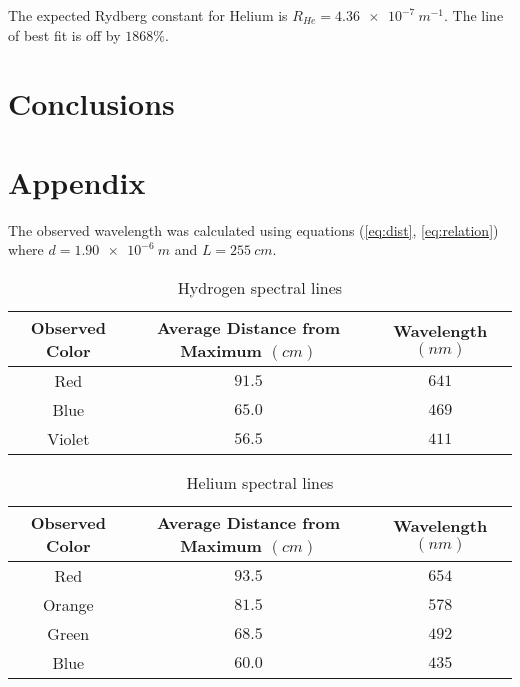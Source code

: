 \documentclass{article}
\newcommand{\givenGrating}[0]{\ensuremath{\num{1.90e-6} \: \si{m}}}
\newcommand{\length}[0]{\ensuremath{\num{255} \: \si{cm}}}
\begin{document}
The expected Rydberg constant for Helium is $R_{He} = \num{4.36e-7} \: \si{m^{-1}}$.
The line of best fit is off by $1868\%$.

\section{Conclusions}

\lipsum[8-9]

\section{Appendix}

The observed wavelength was calculated using equations (\ref{eq:dist},
\ref{eq:relation}) where $d = \givenGrating$ and $L = \length$.

\begin{table}[h!]
  \centering
  \begin{tabular}{ |c|c|c| }
    \hline
    Observed Color & Average Distance from Maximum $(\si{cm})$ & Wavelength $(\si{nm})$ \\
    \hline
    Red    & $91.5$ & $641$ \\
    Blue   & $65.0$ & $469$ \\
    Violet & $56.5$ & $411$ \\
    \hline
  \end{tabular}
  \caption{
    Hydrogen spectral lines
  }
  \label{table:hydrogen-distances}
\end{table}

\begin{table}[h!]
  \centering
  \begin{tabular}{ |c|c|c| }
    \hline
    Observed Color & Average Distance from Maximum $(\si{cm})$ & Wavelength $(\si{nm})$ \\
    \hline
    Red    & $93.5$ & $654$ \\
    Orange & $81.5$ & $578$ \\
    Green  & $68.5$ & $492$ \\
    Blue   & $60.0$ & $435$ \\
    \hline
  \end{tabular}
  \caption{
    Helium spectral lines
  }
  \label{table:helium-distances}
\end{table}




\end{document}
